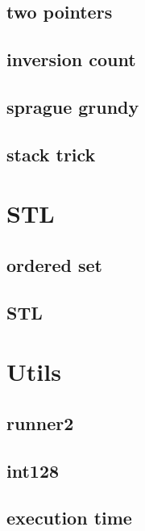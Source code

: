 \subsection{two pointers}
\raggedbottom
\hrulefill
\subsection{inversion count}
\raggedbottom
\hrulefill
\subsection{sprague grundy}
\raggedbottom
\hrulefill
\subsection{stack trick}
\raggedbottom
\hrulefill

\section{STL}
\subsection{ordered set}
\raggedbottom
\hrulefill
\subsection{STL}
\raggedbottom
\hrulefill

\section{Utils}
\subsection{runner2}
\raggedbottom
\hrulefill
\subsection{  int128}
\raggedbottom
\hrulefill
\subsection{execution time}
\raggedbottom
\hrulefill
